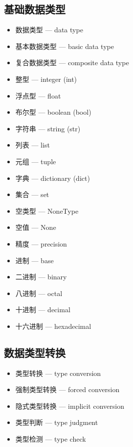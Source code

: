 \subsection{基础数据类型}
\begin{itemize}
\item 数据类型 — data type
\item 基本数据类型 — basic data type
\item 复合数据类型 — composite data type
\item 整型 — integer (int)
\item 浮点型 — float
\item 布尔型 — boolean (bool)
\item 字符串 — string (str)
\item 列表 — list
\item 元组 — tuple
\item 字典 — dictionary (dict)
\item 集合 — set
\item 空类型 — NoneType
\item 空值 — None
\item 精度 — precision
\item 进制 — base
\item 二进制 — binary
\item 八进制 — octal
\item 十进制 — decimal
\item 十六进制 — hexadecimal
\end{itemize}

\subsection{数据类型转换}
\begin{itemize}
\item 类型转换 — type conversion
\item 强制类型转换 — forced conversion
\item 隐式类型转换 — implicit conversion
\item 类型判断 — type judgment
\item 类型检测 — type check
\end{itemize}

